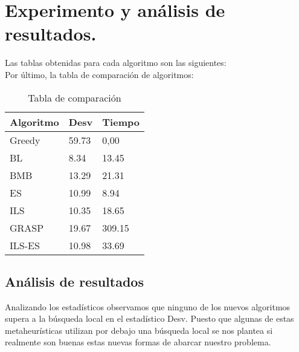 \newpage
\section{Experimento y análisis de resultados.}

Las tablas obtenidas para cada algoritmo son las siguientes:\\




















\newpage
Por último, la tabla de comparación de algoritmos:

\begin{table}[htbp]
	\begin{center}
		\begin{tabular}{|l|l|l|}
			\hline
			Algoritmo &  Desv & Tiempo\\
			\hline \hline
			Greedy & 59.73 & 0,00\\ \hline
			BL & 8.34 & 13.45 \\ \hline
			BMB & 13.29 & 21.31 \\ \hline
			ES & 10.99 & 8.94 \\ \hline
			ILS & 10.35 & 18.65 \\ \hline
			GRASP & 19.67 & 309.15 \\ \hline
			ILS-ES & 10.98 & 33.69 \\ \hline
		\end{tabular}
		\caption{Tabla de comparación}
		\label{tabla:TablaComparacion}
	\end{center}
\end{table}

\newpage

\subsection{Análisis de resultados}

Analizando los estadísticos observamos que ninguno de los nuevos algoritmos supera a la búsqueda local en el estadístico Desv. Puesto que algunas de estas metaheurísticas  utilizan por debajo una búsqueda local se nos plantea si realmente son buenas estas nuevas formas de abarcar nuestro problema.\\


